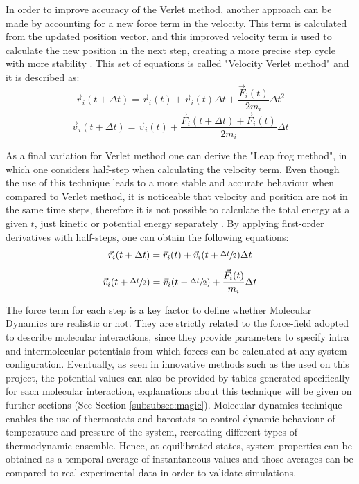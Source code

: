 \documentclass[10pt,a4paper,twoside]{article}
\begin{document}
In order to improve accuracy of the Verlet method, another approach can be made by accounting for a new force term in the velocity. This term is calculated from the updated position vector, and this improved velocity term is used to calculate the new position in the next step, creating a more precise step cycle with more stability \cite{satoh}. This set of equations is called "Velocity Verlet method" and it is described as:
\begin{equation}
\vec{r}_i(t+\Delta t) = \vec{r}_i(t) + \vec{v}_i(t)\Delta t + \dfrac{\vec{F}_i(t)}{2m_i}{\Delta t}^2
\label{eqn:vverletr}
\end{equation}
\begin{equation}
\vec{v}_i(t+\Delta t) = \vec{v}_i(t) + \dfrac{\vec{F}_i(t+\Delta t)+\vec{F}_i(t)}{2m_i}\Delta t
\label{eqn:vverletv}
\end{equation}

As a final variation for Verlet method one can derive the "Leap frog method", in which one considers half-step when calculating the velocity term. Even though the use of this technique leads to a more stable and accurate behaviour when compared to Verlet method, it is noticeable that velocity and position are not in the same time steps, therefore it is not possible to calculate the total energy at a given $t$, just kinetic or potential energy separately \cite{umd}. By applying first-order derivatives with half-steps, one can obtain the following equations:
\begin{equation}
\vec{r}_i(t+\Delta t) = \vec{r}_i(t) + \vec{v}_i(t+\sfrac{\Delta t}{2})\Delta t
\label{eqn:leapfrogr}
\end{equation}
\begin{equation}
\vec{v}_i(t+\sfrac{\Delta t}{2}) = \vec{v}_i(t-\sfrac{\Delta t}{2}) + \dfrac{\vec{F}_i(t)}{m_i}\Delta t
\label{eqn:leapfrogv}
\end{equation}

The force term for each step is a key factor to define whether Molecular Dynamics are realistic or not. They are strictly related to the force-field adopted to describe molecular interactions, since they provide parameters to specify intra and intermolecular potentials from which forces can be calculated at any system configuration. Eventually, as seen in innovative methods such as the used on this project, the potential values can also be provided by tables generated specifically for each molecular interaction, explanations about this technique will be given on further sections (See Section \ref{subsubsec:magic}). Molecular dynamics technique enables the use of thermostats and barostats to control dynamic behaviour of temperature and pressure of the system, recreating different types of thermodynamic ensemble. Hence, at equilibrated states, system properties can be obtained as a temporal average of instantaneous values and those averages can be compared to real experimental data in order to validate simulations.
\end{document}
